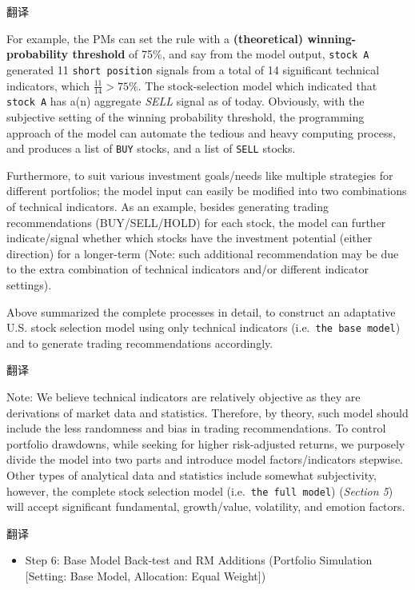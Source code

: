\documentclass[
]{book}
\providecommand{\tightlist}{%
  \setlength{\itemsep}{0pt}\setlength{\parskip}{0pt}}
\begin{document}
翻译

For example, the PMs can set the rule with a \textbf{(theoretical)
winning-probability threshold} of 75\%, and say from the model output,
\texttt{stock\ A} generated 11 \texttt{short\ position} signals from a
total of 14 significant technical indicators, which
\(\frac{11}{14}>75\%\). The stock-selection model which indicated that
\texttt{stock\ A} has a(n) aggregate \emph{SELL} signal as of today.
Obviously, with the subjective setting of the winning probability
threshold, the programming approach of the model can automate the
tedious and heavy computing process, and produces a list of \texttt{BUY}
stocks, and a list of \texttt{SELL} stocks.

Furthermore, to suit various investment goals/needs like multiple
strategies for different portfolios; the model input can easily be
modified into two combinations of technical indicators. As an example,
besides generating trading recommendations (BUY/SELL/HOLD) for each
stock, the model can further indicate/signal whether which stocks have
the investment potential (either direction) for a longer-term (Note:
such additional recommendation may be due to the extra combination of
technical indicators and/or different indicator settings).

Above summarized the complete processes in detail, to construct an
adaptative U.S. stock selection model using only technical indicators
(i.e.~\texttt{the\ base\ model}) and to generate trading recommendations
accordingly.

翻译

Note: We believe technical indicators are relatively objective as they
are derivations of market data and statistics. Therefore, by theory,
such model should include the less randomness and bias in trading
recommendations. To control portfolio drawdowns, while seeking for
higher risk-adjusted returns, we purposely divide the model into two
parts and introduce model factors/indicators stepwise. Other types of
analytical data and statistics include somewhat subjectivity, however,
the complete stock selection model (i.e.~\texttt{the\ full\ model})
(\emph{Section 5}) will accept significant fundamental, growth/value,
volatility, and emotion factors.

翻译

\begin{itemize}
\tightlist
\item
  Step 6: Base Model Back-test and RM Additions (Portfolio Simulation
  {[}Setting: Base Model, Allocation: Equal Weight{]})
\end{itemize}
\end{document}

